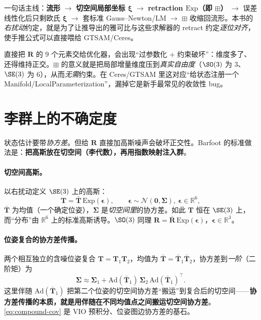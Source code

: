 \begin{insight}
一句话主线：\textbf{流形} $\to$ \textbf{切空间局部坐标 $\boldsymbol{\xi}$} $\to$ \textbf{retraction $\mathrm{Exp}$（即 $\boxplus$）} $\to$ 误差线性化后只剩欧氏 $\boldsymbol{\xi}$ $\to$ 套标准 Gauss–Newton/LM $\to$ $\boxplus$ 收缩回流形。本书的\emph{右扰动}约定，就是为了让推导出的雅可比与这些求解器的 retract 约定\emph{逐位对齐}，使手推公式可以直接喂给 GTSAM/Ceres。
\end{insight}

\begin{pitfall}
直接把 $\mathbf{R}$ 的 $9$ 个元素交给优化器，会出现“过参数化 + 约束破坏”：维度多了、还得维持正交。$\boxplus$ 的意义就是把局部增量维度压到\emph{真实自由度}（$\SO(3)$ 为 $3$、$\SE(3)$ 为 $6$），从而\emph{无需}约束。在 Ceres/GTSAM 里这对应“给状态注册一个 Manifold/LocalParameterization”，漏掉它是新手最常见的收敛性 bug。
\end{pitfall}

\section{李群上的不确定度}
\label{sec:uncertainty}

状态估计要带\emph{协方差}。但给 $\mathbf{R}$ 直接加高斯噪声会破坏正交性。Barfoot\cite{barfoot2024state} 的标准做法是：\textbf{把高斯放在切空间（李代数），再用指数映射注入群}。

\paragraph{切空间高斯。}以右扰动定义 $\SE(3)$ 上的高斯：
\begin{equation}
  \mathbf{T}=\bar{\mathbf{T}}\,\mathrm{Exp}(\boldsymbol{\epsilon}),\qquad \boldsymbol{\epsilon}\sim\mathcal{N}(\mathbf{0},\boldsymbol{\Sigma}),\ \boldsymbol{\epsilon}\in\mathbb{R}^6,
  \label{eq:lie-gaussian}
\end{equation}
$\bar{\mathbf{T}}$ 为均值（一个确定位姿），$\boldsymbol{\Sigma}$ 是\emph{切空间里}的协方差。如此 $\mathbf{T}$ 恒在 $\SE(3)$ 上，而“分布”由 $\mathbb{R}^6$ 上的标准高斯诱导。$\SO(3)$ 同理 $\mathbf{R}=\bar{\mathbf{R}}\,\mathrm{Exp}(\boldsymbol{\epsilon})$，$\boldsymbol{\epsilon}\in\mathbb{R}^3$。

\paragraph{位姿复合的协方差传播。}两个相互独立的含噪位姿复合 $\mathbf{T}=\mathbf{T}_1\mathbf{T}_2$，均值为 $\bar{\mathbf{T}}=\bar{\mathbf{T}}_1\bar{\mathbf{T}}_2$，协方差到\emph{一阶}（二阶矩）为
\begin{equation}
  \boldsymbol{\Sigma}\approx\boldsymbol{\Sigma}_1+\mathrm{Ad}(\bar{\mathbf{T}}_1)\,\boldsymbol{\Sigma}_2\,\mathrm{Ad}(\bar{\mathbf{T}}_1)^\top.
  \label{eq:compound-cov}
\end{equation}
这里伴随 $\mathrm{Ad}(\bar{\mathbf{T}}_1)$ 把第二个位姿的切空间协方差“搬运”到复合后的切空间——\textbf{协方差传播的本质，就是用伴随在不同均值点之间搬运切空间协方差}。\cref{eq:compound-cov} 是 VIO 预积分、位姿图边协方差的基石。

